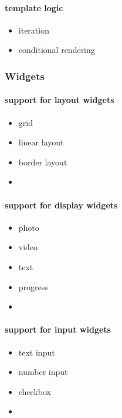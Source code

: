 \paragraph{template logic}
\begin{itemize}
    \item iteration
    \item conditional rendering
\end{itemize}

\subsubsection{Widgets}

\paragraph{support for layout widgets}
\begin{itemize}
    \item grid
    \item linear layout
    \item border layout
    \item \textellipsis
\end{itemize}

\paragraph{support for display widgets}
\begin{itemize}
    \item photo
    \item video
    \item text
    \item progress
    \item \textellipsis
\end{itemize}

\paragraph{support for input widgets}
\begin{itemize}
    \item text input
    \item number input
    \item checkbox
    \item \textellipsis
\end{itemize}

